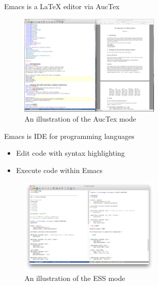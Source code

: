 \documentclass[presentation]{beamer}
\begin{document}
\begin{frame}[label={sec:orgb0c058b}]{Emacs is a \LaTeX{} editor via AucTex}
\begin{figure}[htbp]
\centering
\includegraphics[width=0.6\textwidth]{figure/auctex_example.png}
\caption{An illustration of the AucTex mode}
\end{figure}
\end{frame}

\begin{frame}[label={sec:org2af310b}]{Emacs is IDE for programming languages}
\begin{itemize}
\item Edit code with syntax highlighting
\item Execute code within Emacs
\end{itemize}

\begin{figure}[htbp]
\centering
\includegraphics[width=0.6\textwidth]{figure/r_example.png}
\caption{An illustration of the ESS mode}
\end{figure}
\end{frame}
\end{document}
